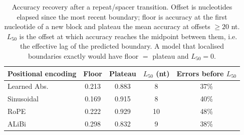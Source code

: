 \begin{table}[t]
\centering
\caption{Accuracy recovery after a repeat/spacer transition. Offset is nucleotides elapsed since the most recent boundary; floor is accuracy at the first nucleotide of a new block and plateau the mean accuracy at offsets $\geq 20$ nt. $L_{50}$ is the offset at which accuracy reaches the midpoint between them, i.e. the effective lag of the predicted boundary. A model that localised boundaries exactly would have floor $=$ plateau and $L_{50}=0$.}
\label{tab:boundary-lag}
\begin{tabular}{lcccc}
\toprule
Positional encoding & Floor & Plateau & $L_{50}$ (nt) & Errors before $L_{50}$ \\
\midrule
Learned Abs. & 0.213 & 0.883 & 8 & 37\% \\
Sinusoidal & 0.169 & 0.915 & 8 & 40\% \\
RoPE & 0.222 & 0.929 & 10 & 48\% \\
ALiBi & 0.298 & 0.832 & 9 & 38\% \\
\bottomrule
\end{tabular}
\end{table}